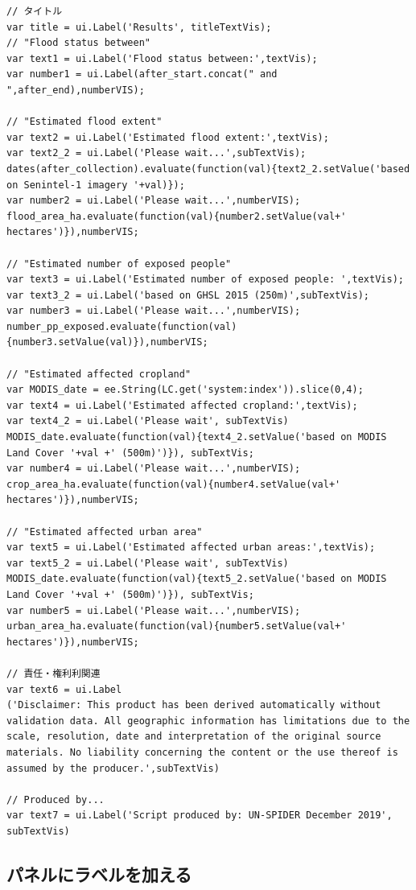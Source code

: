 \documentclass[
]{book}
\begin{document}
\begin{verbatim}
// タイトル
var title = ui.Label('Results', titleTextVis);
// "Flood status between"
var text1 = ui.Label('Flood status between:',textVis);
var number1 = ui.Label(after_start.concat(" and ",after_end),numberVIS);

// "Estimated flood extent"
var text2 = ui.Label('Estimated flood extent:',textVis);
var text2_2 = ui.Label('Please wait...',subTextVis);
dates(after_collection).evaluate(function(val){text2_2.setValue('based on Senintel-1 imagery '+val)});
var number2 = ui.Label('Please wait...',numberVIS); 
flood_area_ha.evaluate(function(val){number2.setValue(val+' hectares')}),numberVIS;

// "Estimated number of exposed people"
var text3 = ui.Label('Estimated number of exposed people: ',textVis);
var text3_2 = ui.Label('based on GHSL 2015 (250m)',subTextVis);
var number3 = ui.Label('Please wait...',numberVIS);
number_pp_exposed.evaluate(function(val){number3.setValue(val)}),numberVIS;

// "Estimated affected cropland"
var MODIS_date = ee.String(LC.get('system:index')).slice(0,4);
var text4 = ui.Label('Estimated affected cropland:',textVis);
var text4_2 = ui.Label('Please wait', subTextVis)
MODIS_date.evaluate(function(val){text4_2.setValue('based on MODIS Land Cover '+val +' (500m)')}), subTextVis;
var number4 = ui.Label('Please wait...',numberVIS);
crop_area_ha.evaluate(function(val){number4.setValue(val+' hectares')}),numberVIS;

// "Estimated affected urban area"
var text5 = ui.Label('Estimated affected urban areas:',textVis);
var text5_2 = ui.Label('Please wait', subTextVis)
MODIS_date.evaluate(function(val){text5_2.setValue('based on MODIS Land Cover '+val +' (500m)')}), subTextVis;
var number5 = ui.Label('Please wait...',numberVIS);
urban_area_ha.evaluate(function(val){number5.setValue(val+' hectares')}),numberVIS;

// 責任・権利利関連
var text6 = ui.Label
('Disclaimer: This product has been derived automatically without validation data. All geographic information has limitations due to the scale, resolution, date and interpretation of the original source materials. No liability concerning the content or the use thereof is assumed by the producer.',subTextVis)

// Produced by...
var text7 = ui.Label('Script produced by: UN-SPIDER December 2019', subTextVis)
\end{verbatim}

\hypertarget{ux30d1ux30cdux30ebux306bux30e9ux30d9ux30ebux3092ux52a0ux3048ux308b}{%
\subsection{パネルにラベルを加える}\label{ux30d1ux30cdux30ebux306bux30e9ux30d9ux30ebux3092ux52a0ux3048ux308b}}
\end{document}
